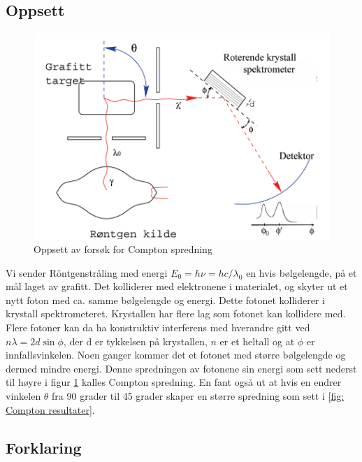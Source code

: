 \subsection{Oppsett}
\begin{figure}[h!]
  \centering
  \includegraphics[scale = .4]{Figures/Compton oppsett.png}
  \caption{Oppsett av forsøk for Compton spredning}
  \label{fig: Compton oppsett}
\end{figure}

Vi sender Röntgenstråling med energi $E_0 = hν = h c / λ_0$ en hvis bølgelengde, på et mål laget av grafitt. Det kolliderer med elektronene i materialet, og skyter ut et nytt foton med ca. samme bølgelengde og energi. Dette fotonet kolliderer i krystall spektrometeret. Krystallen har flere lag som fotonet kan kollidere med. Flere fotoner kan da ha konstruktiv interferens med hverandre gitt ved $nλ = 2d \sin ϕ$, der d er tykkelsen på krystallen, $n$ er et heltall og at $ϕ$ er innfallsvinkelen. Noen ganger kommer det et fotonet med større bølgelengde og dermed mindre energi. Denne spredningen av fotonene sin energi som sett nederst til høyre i figur \ref{fig: Compton oppsett} kalles Compton spredning. En fant også ut at hvis en endrer vinkelen $θ$ fra 90 grader til 45 grader skaper en større spredning som sett i \ref{fig: Compton resultater}. 

\subsection{Forklaring}

